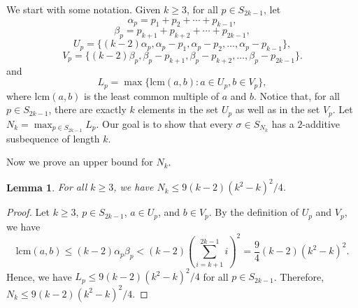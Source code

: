 \documentclass[11pt]{article}
\newtheorem{lemma}[theorem]{Lemma}
\theoremstyle{definition}
\begin{document}
We start with some notation. Given $k\geq3$, for all $p\in S_{2k-1}$, let \[\alpha_p=p_1+p_2+\cdots+p_{k-1},\] \[\beta_p=p_{k+1}+p_{k+2}+\cdots+p_{2k-1},\]
    \[
    U_p=\{(k-2)\alpha_p,\alpha_p-p_1,\alpha_p-p_2,\ldots,\alpha_p-p_{k-1}\},
    \]
    \[
    V_p=\{(k-2)\beta_p,\beta_p-p_{k+1},\beta_p-p_{k+2},\ldots,\beta_p-p_{2k-1}\}.
    \]
    and \[L_p=\max\{\text{lcm}(a,b):a\in U_p,b\in V_p\},\] where $\text{lcm}(a,b)$ is the least common multiple of $a$ and $b$. Notice that, for all $p\in S_{2k-1}$, there are exactly $k$ elements in the set $U_p$ as well as in the set $V_p$. Let $N_k=\max_{p\in S_{2k-1}}L_p$. Our goal is to show that every $\sigma\in S_{N_k}$ has a $2$-additive susbequence of length $k$.

Now we prove an upper bound for $N_k$.

\begin{lemma}\label{Lemma:UppderBoundN}
For all $k\geq3$, we have $N_k\leq 9(k-2)(k^2-k)^2/4$.
\end{lemma}
\begin{proof}
Let $k\geq3$, $p\in S_{2k-1}$, $a\in U_p$, and $b\in V_p$. By the definition of $U_p$ and $V_p$, we have
\[
\text{lcm}(a,b)\leq(k-2)\alpha_p\beta_p<(k-2)\left(\sum_{i=k+1}^{2k-1}i\right)^2=\frac{9}{4}(k-2)(k^2-k)^2.
\]
Hence, we have $L_p\leq 9(k-2)(k^2-k)^2/4$ for all $p\in S_{2k-1}$. Therefore, $N_k\leq 9(k-2)(k^2-k)^2/4$.
\end{proof}
    
\end{document}
